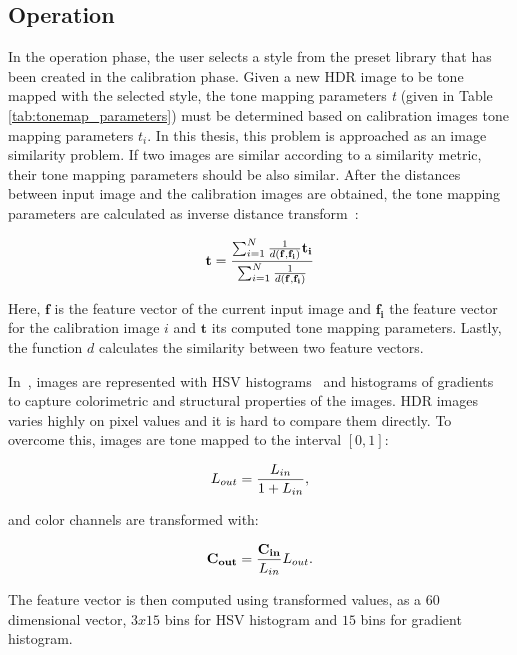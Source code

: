 \subsection{Operation}
\label{sec:operation}
In the operation phase, the user selects a style from the preset library that has been created in the calibration phase. Given a new HDR image to be tone mapped with the selected style, the tone mapping parameters \emph{t} (given in Table \ref{tab:tonemap_parameters}) must be determined based on calibration images tone mapping parameters \emph{$t_i$}. In this thesis, this problem is approached as an image similarity problem. If two images are similar according to a similarity metric, their tone mapping parameters should be also similar. After the distances between input image and the calibration images are obtained, the tone mapping parameters are calculated as inverse distance transform~\cite{Shepard1968}:

\begin{equation}
\label{eq:inv_distance_transform}
    \mathbf{t} = {{\sum _{i=1} ^{N} {1 \over {d(\mathbf{f}, \mathbf{f_i})}} \mathbf{t_i}} \over {\sum _{i=1} ^{N} {1 \over {d(\mathbf{f}, \mathbf{f_i})}}}}
\end{equation}

Here, $\mathbf{f}$ is the feature vector of the current input image and $\mathbf{f_i}$ the feature vector for the calibration image $i$ and $\mathbf{t}$ its computed tone mapping parameters. Lastly, the function $d$ calculates the similarity between two feature vectors.

In~\cite{akyuz2013style}, images are represented with HSV histograms~\cite{Ben2006} and histograms of gradients~\cite{dalal2005histograms} to capture colorimetric and structural properties of the images. HDR images varies highly on pixel values and it is hard to compare them directly. To overcome this, images are tone mapped to the interval $[0,1]$:

\begin{equation}
    L_{out} = {{L_{in}} \over {1 + L_{in}}}, 
\end{equation}

and color channels are transformed with:

\begin{equation}
    \mathbf{C_{out}} = {{\mathbf{C_{in}}}\over{L_{in}}} L_{out}.
\end{equation}

The feature vector is then computed using transformed values, as a $60$ dimensional vector, $3x15$ bins for HSV histogram and $15$ bins for gradient histogram. 

